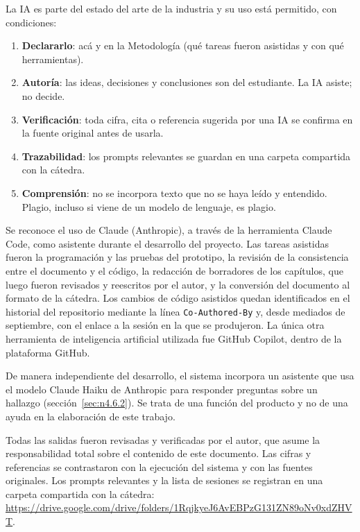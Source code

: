 
\begin{guia}
La IA es parte del estado del arte de la industria y su uso está
permitido, con condiciones:
\begin{enumerate}
    \item \textbf{Declararlo}: acá y en la Metodología (qué tareas fueron
          asistidas y con qué herramientas).
    \item \textbf{Autoría}: las ideas, decisiones y conclusiones son del
          estudiante. La IA asiste; no decide.
    \item \textbf{Verificación}: toda cifra, cita o referencia sugerida por
          una IA se confirma en la fuente original antes de usarla.
    \item \textbf{Trazabilidad}: los prompts relevantes se guardan en una
          carpeta compartida con la cátedra.
    \item \textbf{Comprensión}: no se incorpora texto que no se haya leído
          y entendido. Plagio, incluso si viene de un modelo de lenguaje,
          es plagio.
\end{enumerate}
\end{guia}

Se reconoce el uso de Claude (Anthropic), a través de la herramienta
Claude Code, como asistente durante el desarrollo del proyecto. Las
tareas asistidas fueron la programación y las pruebas del prototipo, la
revisión de la consistencia entre el documento y el código, la redacción
de borradores de los capítulos, que luego fueron revisados y reescritos
por el autor, y la conversión del documento al formato de la cátedra. Los
cambios de código asistidos quedan identificados en el historial del
repositorio mediante la línea \texttt{Co-Authored-By} y, desde
mediados de septiembre, con el enlace a la sesión en la que se
produjeron. La única otra herramienta
de inteligencia artificial utilizada fue GitHub Copilot, dentro de la
plataforma GitHub.

De manera independiente del desarrollo, el sistema incorpora un
asistente que usa el modelo Claude Haiku de Anthropic para responder
preguntas sobre un hallazgo (sección~\ref{sec:n4.6.2}). Se trata de una
función del producto y no de una ayuda en la elaboración de este
trabajo.

Todas las salidas fueron revisadas y verificadas por el autor, que asume
la responsabilidad total sobre el contenido de este documento. Las cifras
y referencias se contrastaron con la ejecución del sistema y con las
fuentes originales. Los prompts relevantes y la lista de sesiones
se registran en una carpeta compartida con la cátedra:
\url{https://drive.google.com/drive/folders/1RqjkyeJ6AvEBPzG131ZN89oNv0xdZHVT}.
